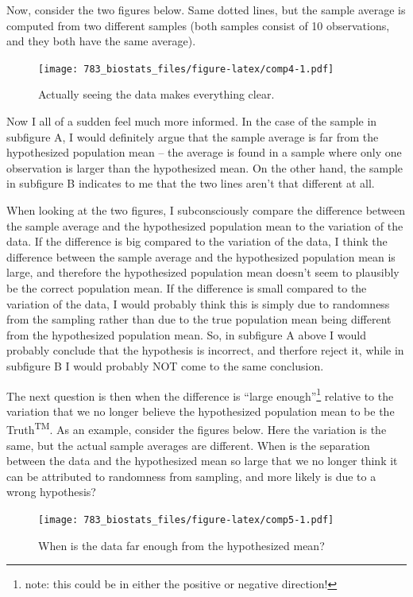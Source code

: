 \documentclass[]{book}
\let\rmarkdownfootnote\footnote%
\def\footnote{\protect\rmarkdownfootnote}
\theoremstyle{definition}
\theoremstyle{definition}
\theoremstyle{definition}
\theoremstyle{remark}
\begin{document}
Now, consider the two figures below. Same dotted lines, but the sample average is computed from two different samples (both samples consist of 10 observations, and they both have the same average).

\begin{figure}
\centering
\texttt{[image: 783\_biostats\_files/figure-latex/comp4-1.pdf]}
\caption{\label{fig:comp4}Actually seeing the data makes everything clear.}
\end{figure}

Now I all of a sudden feel much more informed. In the case of the sample in subfigure A, I would definitely argue that the sample average is far from the hypothesized population mean -- the average is found in a sample where only one observation is larger than the hypothesized mean. On the other hand, the sample in subfigure B indicates to me that the two lines aren't that different at all.

When looking at the two figures, I subconsciously compare the difference between the sample average and the hypothesized population mean to the variation of the data. If the difference is big compared to the variation of the data, I think the difference between the sample average and the hypothesized population mean is large, and therefore the hypothesized population mean doesn't seem to plausibly be the correct population mean. If the difference is small compared to the variation of the data, I would probably think this is simply due to randomness from the sampling rather than due to the true population mean being different from the hypothesized population mean. So, in subfigure A above I would probably conclude that the hypothesis is incorrect, and therfore reject it, while in subfigure B I would probably NOT come to the same conclusion.

The next question is then when the difference is ``large enough''\footnote{note: this could be in either the positive or negative direction!} relative to the variation that we no longer believe the hypothesized population mean to be the Truth\textsuperscript{TM}. As an example, consider the figures below. Here the variation is the same, but the actual sample averages are different. When is the separation between the data and the hypothesized mean so large that we no longer think it can be attributed to randomness from sampling, and more likely is due to a wrong hypothesis?

\begin{figure}
\centering
\texttt{[image: 783\_biostats\_files/figure-latex/comp5-1.pdf]}
\caption{\label{fig:comp5}When is the data far enough from the hypothesized mean?}
\end{figure}
\end{document}
